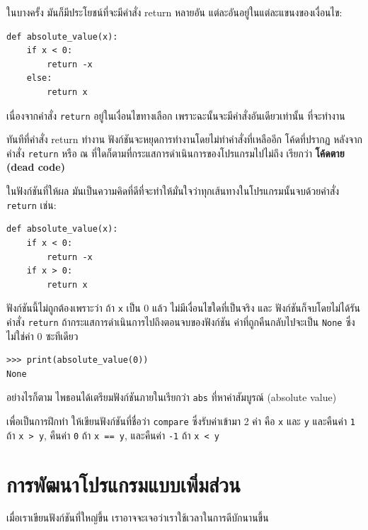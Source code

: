 ในบางครั้ง มันก็มีประโยชน์ที่จะมีคำสั่ง return หลายอัน แต่ละอันอยู่ในแต่ละแขนงของเงื่อนไข:

\begin{verbatim}
def absolute_value(x):
    if x < 0:
        return -x
    else:
        return x
\end{verbatim}
%
เนื่องจากคำสั่ง {\tt return} อยู่ในเงื่อนไขทางเลือก เพราะฉะนั้นจะมีคำสั่งอันเดียวเท่านั้น
ที่จะทำงาน

ทันทีที่คำสั่ง return ทำงาน ฟังก์ชันจะหยุดการทำงานโดยไม่ทำคำสั่งที่เหลืออีก โค้ดที่ปรากฏ
หลังจากคำสั่ง {\tt return} หรือ ณ ที่ใดก็ตามที่กระแสการดำเนินการของโปรแกรมไปไม่ถึง เรียกว่า
{\bf โค้ดตาย (dead code)}

ในฟังก์ชันที่ให้ผล มันเป็นความคิดที่ดีที่จะทำให้มั่นใจว่าทุกเส้นทางในโปรแกรมนั้นจบด้วยคำสั่ง 
{\tt return} เช่น:

\begin{verbatim}
def absolute_value(x):
    if x < 0:
        return -x
    if x > 0:
        return x
\end{verbatim}
%
ฟังก์ชันนี้ไม่ถูกต้องเพราะว่า ถ้า {\tt x} เป็น 0 แล้ว ไม่มีเงื่อนไขใดที่เป็นจริง และ
ฟังก์ชันก็จบโดยไม่ได้รันคำสั่ง {\tt return} ถ้ากระแสการดำเนินการไปถึงตอนจบของฟังก์ชัน 
ค่าที่ถูกคืนกลับไปจะเป็น {\tt None} ซึ่งไม่ใช่ค่า 0 ซะทีเดียว

\begin{verbatim}
>>> print(absolute_value(0))
None
\end{verbatim}
%
อย่างไรก็ตาม ไพธอนได้เตรียมฟังก์ชันภายในเรียกว่า {\tt abs} ที่หาค่าสัมบูรณ์ (absolute value)

เพื่อเป็นการฝึกทำ ให้เขียนฟังก์ชันที่ชื่อว่า {\tt compare} ซึ่งรับค่าเข้ามา 2 ค่า คือ {\tt x} และ {\tt y}
และคืนค่า {\tt 1} ถ้า {\tt x > y}, คืนค่า {\tt 0} ถ้า {\tt x == y}, และคืนค่า {\tt -1} ถ้า {\tt x < y}


\section{การพัฒนาโปรแกรมแบบเพิ่มส่วน} %
\label{incremental.development}

เมื่อเราเขียนฟังก์ชันที่ใหญ่ขึ้น เราอาจจะเจอว่าเราใช้เวลาในการดีบักนานขึ้น

